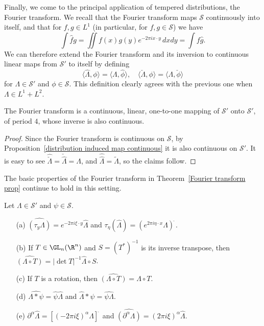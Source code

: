Finally, we come to the principal application of tempered distributions, the Fourier transform. We recall that the Fourier transform maps $\mathscr{S}$ continuously into itself, and that for $f,g\in L^1$ (in particular, for $f,g\in\mathscr{S}$) we have
\[\int\hat{f}g=\iint f(x)g(y)e^{-2\pi ix\cdot y}\,dxdy=\int f\hat{g}.\]
We can therefore extend the Fourier transform and its inversion to continuous linear maps from $\mathscr{S}'$ to itself by defining
\[\langle\hat{\Lambda},\phi\rangle=\langle\Lambda,\hat{\phi}\rangle,\quad\langle\check{\Lambda},\phi\rangle=\langle\Lambda,\check{\phi}\rangle\]
for $\Lambda\in\mathscr{S}'$ and $\phi\in\mathscr{S}$. This definition clearly agrees with the previous one when $\Lambda\in L^1+L^2$.
\begin{proposition}
The Fourier transform is a continuous, linear, one-to-one mapping of $\mathscr{S}'$ onto $\mathscr{S}'$, of period $4$, whose inverse is also continuous.
\end{proposition}
\begin{proof}
Since the Fourier transform is continuous on $\mathscr{S}$, by Proposition~\ref{distribution induced map continuous} it is also continuous on $\mathscr{S}'$. It is easy to see $\hat{\check{\Lambda}}=\check{\hat{\Lambda}}=\Lambda$, and $\hat{\hat{\Lambda}}=\widetilde{\Lambda}$, so the claims follow.
\end{proof}
The basic properties of the Fourier transform in Theorem~\ref{Fourier transform prop} continue to hold in this setting.
\begin{theorem}
Let $\Lambda\in\mathscr{S}'$ and $\psi\in\mathscr{S}$.
\begin{itemize}
\item[(a)] $\widehat{(\tau_y\Lambda)}=e^{-2\pi i\xi\cdot y}\hat{\Lambda}$ and $\tau_\eta(\hat{\Lambda})=(e^{2\pi i\eta\cdot x}\Lambda)^{\widehat{\ }}$.
\item[(b)] If $T\in\GL_n(\R^n)$ and $S=(T^*)^{-1}$ is its inverse transpose, then $\widehat{(\Lambda\circ T)}=|\det T|^{-1}\hat{\Lambda}\circ S$.
\item[(c)] If $T$ is a rotation, then $\widehat{(\Lambda\circ T)}=\hat{\Lambda}\circ T$.
\item[(d)] $\widehat{\Lambda\ast\psi}=\hat{\psi}\hat{\Lambda}$ and $\hat{\Lambda}\ast\hat{\psi}=\widehat{\psi\Lambda}$. 
\item[(e)] $\partial^\alpha\hat{\Lambda}=[(-2\pi i\xi)^\alpha \Lambda]^{\widehat{\ }}$ and $\widehat{(\partial^\alpha \Lambda)}=(2\pi i\xi)^\alpha\hat{\Lambda}$.
\end{itemize}
\end{theorem}
